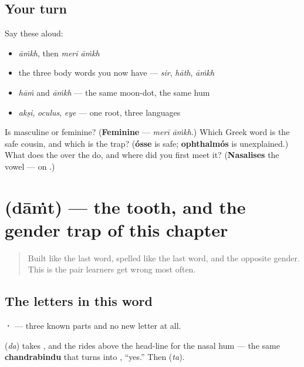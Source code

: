 \subsection*{Your turn}
Say these aloud:

\begin{itemize}
\raggedright
  \item \emph{āṁkh}, then \emph{merī āṁkh}
  \item the three body words you now have — \emph{sir}, \emph{hāth}, \emph{āṁkh}
  \item \emph{hāṁ} and \emph{āṁkh} — the same moon-dot, the same hum
  \item \emph{akṣi}, \emph{oculus}, \emph{eye} — one root, three languages
\end{itemize}

\begin{tcolorbox}[breakable,colback=teal!4,colframe=teal!35!black,title={Before you move on}]
Is \textbf{} masculine or feminine? (\textbf{Feminine} — \emph{merī āṁkh}.) Which Greek word is the safe cousin, and which is the trap? (\textbf{ósse} is safe; \textbf{ophthalmós} is unexplained.) What does the \textbf{} over the \textbf{} do, and where did you first meet it? (\textbf{Nasalises} the vowel — on \textbf{}.)
\end{tcolorbox}
\section[\texorpdfstring{\hi{दाँत} (danta)}{दाँत (danta)}]{ (dāṁt) — the tooth, and the gender trap of this chapter}

\label{lesson:HI-C38-daant}



\begin{quote}
Built like the last word, spelled like the last word, and the opposite gender. This is the pair learners get wrong most often.
\end{quote}

\subsection*{The letters in this word}
\textbf{·} — three known parts and no new letter at all.

\textbf{} (\emph{da}) takes \textbf{}, and the \textbf{} rides above the head-line for the nasal hum — the same \textbf{chandrabindu} that turns \textbf{} into \textbf{}, \textquotedblleft{}yes.\textquotedblright{} Then \textbf{} (\emph{ta}).

